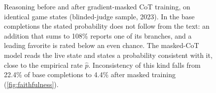 \begin{figure}[t]
\begin{minipage}{0.99\textwidth}
\end{minipage}
\caption{Reasoning before and after gradient-masked CoT training, on identical game states
(blinded-judge sample, 2023). In the base completions the stated probability does not follow from
the text: an addition that sums to 108\% reports one of its branches, and a leading favorite is
rated below an even chance. The masked-CoT model reads the live state and states a probability
consistent with it, close to the empirical rate $\hat{p}$. Inconsistency of this kind falls from
22.4\% of base completions to 4.4\% after masked training (\cref{fig:faithfulness}).}
\label{fig:reasoning-examples}
\end{figure}
